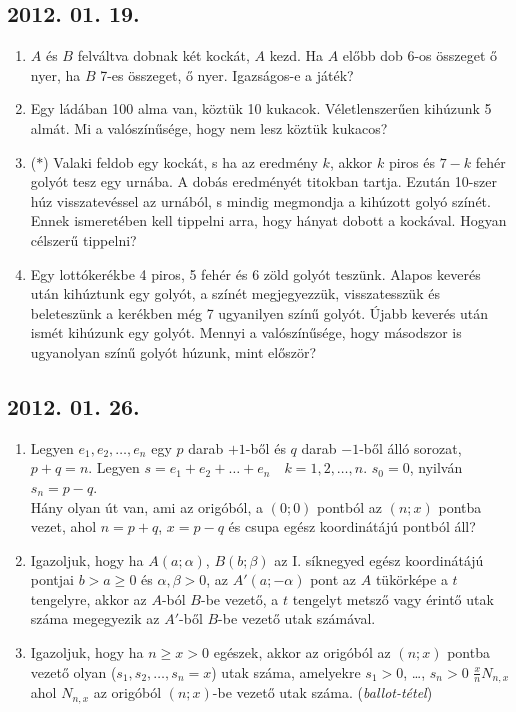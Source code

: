 \documentclass{article}
\begin{document}
\subsection*{2012. 01. 19.}
\begin{enumerate}
\item
$A$ és $B$ felváltva dobnak két kockát, $A$ kezd. Ha $A$ előbb dob 6-os összeget ő nyer, ha $B$ 7-es összeget, ő nyer. Igazságos-e a játék?
\item 
Egy ládában 100 alma van, köztük 10 kukacok. Véletlenszerűen kihúzunk 5 almát. Mi a valószínűsége, hogy nem lesz köztük kukacos?
\item ($*$)
Valaki feldob egy kockát, s ha az eredmény $k$, akkor $k$ piros és $7-k$ fehér golyót tesz egy urnába. A dobás eredményét titokban tartja. Ezután 10-szer húz visszatevéssel az urnából, s mindig megmondja a kihúzott golyó színét. Ennek ismeretében kell tippelni arra, hogy hányat dobott a kockával. Hogyan célszerű tippelni?
\item
Egy lottókerékbe 4 piros, 5 fehér és 6 zöld golyót teszünk. Alapos keverés után kihúztunk egy golyót, a színét megjegyezzük, visszatesszük és beleteszünk a kerékben még 7 ugyanilyen színű golyót. Újabb keverés után ismét kihúzunk egy golyót. Mennyi a valószínűsége, hogy másodszor is ugyanolyan színű golyót húzunk, mint először?
\end{enumerate}

\subsection*{2012. 01. 26.}
\begin{enumerate}
\item
Legyen $e_{1}, e_{2},\ldots, e_{n}$ egy $p$ darab $+1$-ből és $q$ darab $-1$-ből álló sorozat, $p+q=n$. Legyen $s=e_{1}+e_{2}+{\ldots}+e_{n}\quad k=1, 2, \ldots, n$. $s_{0}=0$, nyilván $s_{n}=p-q$. \\
Hány olyan út van, ami az origóból, a $(0;0)$ pontból az $(n;x)$ pontba vezet, ahol $n=p+q$, $x=p-q$ és csupa egész koordinátájú pontból áll?
\item
Igazoljuk, hogy ha $A(a;\alpha)$, $B(b;\beta)$ az I. síknegyed egész koordinátájú pontjai $b>a\ge0$ és $\alpha,\beta>0$, az $A'(a;-\alpha)$ pont az $A$ tükörképe a $t$ tengelyre, akkor az $A$-ból $B$-be vezető, a $t$ tengelyt metsző vagy érintő utak száma megegyezik az $A'$-ből $B$-be vezető utak számával. 
\item
Igazoljuk, hogy ha $n\ge x>0$ egészek, akkor az origóból az $(n;x)$ pontba vezető olyan ($s_{1}, s_{2}, {\ldots}, s_{n}=x$) utak száma, amelyekre $s_{1}>0$, {\ldots}, $s_{n}>0$ $\frac{x}{n} N_{n,x}$ ahol $N_{n,x}$ az origóból $(n;x)$-be vezető utak száma. (\textit{ballot-tétel})
\end{enumerate}
\end{document}
